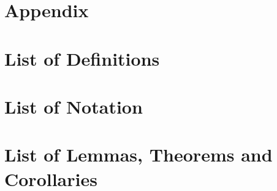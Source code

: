 \newpage
\appendix
\section*{Appendix}


\section{List of Definitions}

\section{List of Notation}

\section{List of Lemmas, Theorems and Corollaries}
